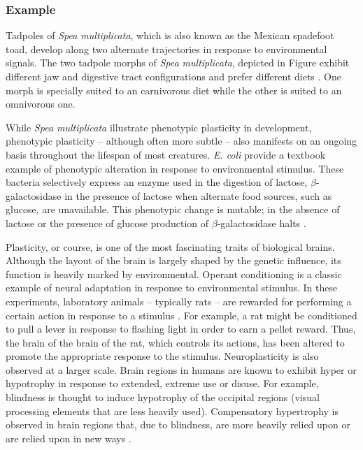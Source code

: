 \subsubsection{Example}
 
Tadpoles of \textit{Spea multiplicata}, which is also known as the Mexican spadefoot toad, develop along two alternate trajectories in response to environmental signals. The two tadpole morphs of \textit{Spea multiplicata}, depicted in Figure  exhibit different jaw and digestive tract configurations and prefer different diets \cite{Fusco2010PhenotypicConcepts}. One morph is specially suited to an carnivorous diet while the other is suited to an omnivorous one\cite{Pfennig1992PolyphenismStrategy}.

While \textit{Spea multiplicata} illustrate phenotypic plasticity in development, phenotypic plasticity -- although often more subtle -- also manifests on an ongoing basis throughout the lifespan of most creatures. \textit{E. coli} provide a textbook example of phenotypic alteration in response to environmental stimulus. These bacteria selectively express an enzyme used in the digestion of lactose, $\beta$-galactosidase in the presence of lactose when alternate food sources, such as glucose, are unavailable. This phenotypic change is mutable; in the absence of lactose or the presence of glucose production of $\beta$-galactosidase halts \cite[page XXX]{Griffiths2015IntroductionAnalysis}.

Plasticity, or course, is one of the most fascinating traits of biological brains. Although the layout of the brain is largely shaped by the genetic influence, its function is heavily marked by environmental. Operant conditioning is a classic example of neural adaptation in response to environmental stimulus. In these experiments, laboratory animals -- typically rats -- are rewarded for performing a certain action in response to a stimulus  \cite{Skinner1991TheAnalysis}. For example, a rat might be conditioned to pull a lever in response to flashing light in order to earn a pellet reward. Thus, the brain of the brain of the rat, which controls its actions, has been altered to promote the appropriate response to the stimulus. Neuroplasticity is also observed at a larger scale. Brain regions in humans are known to exhibit hyper or hypotrophy in response to extended, extreme use or disuse. For example, blindness is thought to induce hypotrophy of the occipital regions (visual processing elements that are less heavily used). Compensatory hypertrophy is observed in brain regions that, due to blindness, are more heavily relied upon or are relied upon in new ways \cite{Lepore2010BrainSubjects}. 

